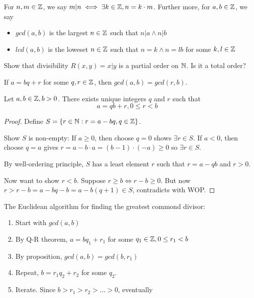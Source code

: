 \documentclass[11pt]{article}
\begin{document}
\begin{definition}[Divisibility]
  For \(n,m \in \mathbb{Z}\), we say \(m|n \iff \exists k \in \mathbb{Z}, n = k \cdot m\). Further more, for \(a,b \in \mathbb{Z}\), we say
  \begin{itemize}
    \item \(gcd(a,b)\) is the largest \(n \in \mathbb{Z}\) such that \(n|a \land n|b\)
    \item \(lcd(a,b)\) is the loweset \(n \in \mathbb{Z}\) such that \(n=k \land n = lb\) for some \(k,l \in \mathbb{Z}\)
  \end{itemize}
\end{definition}

\begin{problem}
  Show that divisibility \(R(x,y) = x | y\) is a partial order on \(\mathbb{N}\). Is it a total order?
\end{problem}
\begin{solution}
\end{solution}

\begin{proposition}
  If \(a=bq+r\) for some \(q,r \in \mathbb{Z}\), then \(gcd(a,b) = gcd(r,b)\).
\end{proposition}

\begin{theorem}
  Let \(a,b \in \mathbb{Z}, b>0\). There exists unique integers \(q\) and \(r\) such that 
  \begin{equation*}
    a = qb+r, 0 \leq r < b
  \end{equation*}
\end{theorem}
\begin{proof} 
  Define \(S = \{r \in \mathbb{N} : r=a-bq, q\in \mathbb{Z}\}\). 

  Show \(S\) is non-empty: If \(a \geq 0\), then choose \(q=0\) shows \(\exists r \in S\). If \(a < 0\), then choose \(q=a\) gives \(r = a-b \cdot a = (b-1)\cdot (-a) \geq 0\) so \(\exists r \in S\).

  By well-ordering principle, \(S\) has a least element \(r \) such that \(r=a-qb\) and \(r > 0\).

  Now want to show \(r < b\). Suppose \(r \geq b \iff r - b \geq 0\). But now \(r > r-b = a - bq - b = a - b(q+1) \in S\), contradicts with WOP.
  
\end{proof}

\begin{algorithm}
  The Euclidean algorithm for finding the greatest commond divisor:
  \begin{enumerate}
    \item Start with \(gcd(a,b)\)
    \item By Q-R theorem, \(a = bq_1 + r_1\) for some \(q_1 \in \mathbb{Z}, 0 \leq r_1 < b\)
    \item By proposition, \(gcd(a,b)=gcd(b,r_1)\)
    \item Repeat, \(b = r_1q_2+r_2\) for some \(q_2\).
    \item Iterate. Since \(b>r_1>r_2>...>0\), eventually
  \end{enumerate}
\end{algorithm}
\end{document}
